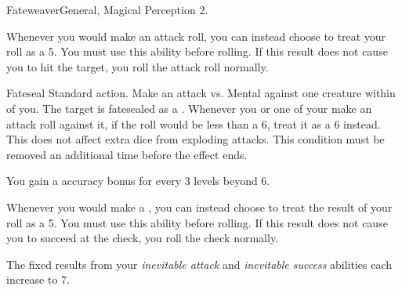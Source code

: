   \begin{feat}{Fateweaver}{General, Magical}
    \featpre Perception 2.

     Whenever you would make an attack roll, you can instead choose to treat your roll as a 5.
    You must use this ability before rolling.
    If this result does not cause you to hit the target, you roll the attack roll normally.

    \begin{magicalactiveability}{Fateseal}
      \abilityusagetime Standard action.
      \rankline
      Make an attack vs. Mental against one creature within \medrange of you.
      \hit The target is fatesealed as a .
      Whenever you or one of your  make an attack roll against it, if the roll would be less than a 6, treat it as a 6 instead.
      This does not affect extra dice from exploding attacks.
      \crit This condition must be removed an additional time before the effect ends.

      \rankline
      You gain a  accuracy bonus for every 3 levels beyond 6.
    \end{magicalactiveability}

     Whenever you would make a , you can instead choose to treat the result of your roll as a 5.
    You must use this ability before rolling.
    If this result does not cause you to succeed at the check, you roll the check normally.

     The fixed results from your \textit{inevitable attack} and \textit{inevitable success} abilities each increase to 7.
  \end{feat}



